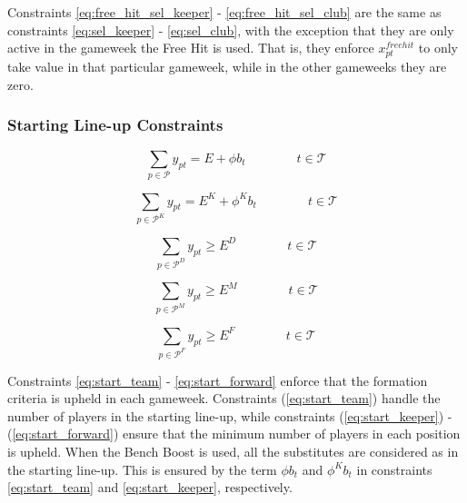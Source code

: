 Constraints \eqref{eq:free_hit_sel_keeper} - \eqref{eq:free_hit_sel_club} are the same as constraints \eqref{eq:sel_keeper} - \eqref{eq:sel_club}, with the exception that they are only active in the gameweek the Free Hit is used. That is, they enforce $x^{freehit}_{pt}$ to only take value in that particular gameweek, while in the other gameweeks they are zero. 

\subsubsection{Starting Line-up Constraints}\label{team_start}

\begin{equation} \label{eq:start_team}
    \sum_{p \in \mathcal{P}}y_{pt}= E  + \phi b_{t} \qquad\qquad t \in \mathcal{T}
\end{equation}

\begin{equation}\label{eq:start_keeper}
    \sum_{p \in \mathcal{P}^{K}} y_{pt}= E^{K} + \phi^{K} b_{t} \qquad\qquad t \in \mathcal{T}
\end{equation}

\begin{equation} \label{eq:start_defender}
    \sum_{p \in \mathcal{P}^{D}} y_{pt} \geq E^{D}  \qquad\qquad t \in \mathcal{T}
\end{equation}

\begin{equation}\label{eq:start_midfielder}
    \sum_{p \in \mathcal{P}^{M}} y_{pt}\geq E^{M} \qquad\qquad t \in \mathcal{T}
\end{equation}

\begin{equation}\label{eq:start_forward}
    \sum_{p \in \mathcal{P}^{F}} y_{pt}\geq E^{F} \qquad\qquad t \in \mathcal{T}
\end{equation}

Constraints \eqref{eq:start_team} - \eqref{eq:start_forward} enforce that the formation criteria is upheld in each gameweek. Constraints (\ref{eq:start_team}) handle the number of players in the starting line-up, while constraints (\ref{eq:start_keeper}) - (\ref{eq:start_forward}) ensure that the minimum number of players in each position is upheld. When the Bench Boost is used, all the substitutes are considered as in the starting line-up. This is ensured by the term $\phi b_{t}$ and $\phi^{K} b_{t}$ in constraints \eqref{eq:start_team} and \eqref{eq:start_keeper}, respectively.  

